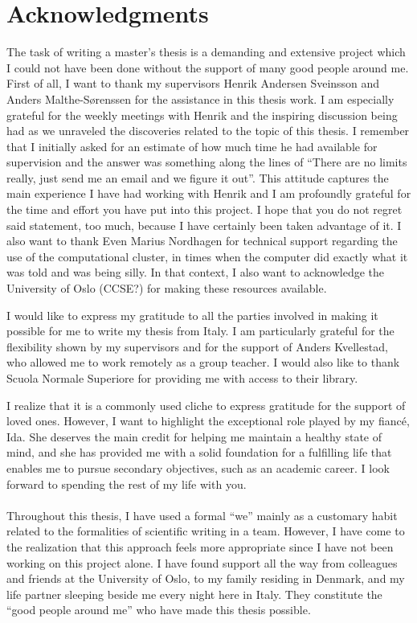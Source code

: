 \chapter*{Acknowledgments}
The task of writing a master's thesis is a demanding and extensive project which
I could not have been done without the support of many good people around me.
First of all, I want to thank my supervisors Henrik Andersen Sveinsson and
Anders Malthe-Sørenssen for the assistance in this thesis work. I am especially
grateful for the weekly meetings with Henrik and the inspiring discussion being
had as we unraveled the discoveries related to the topic of this thesis. I
remember that I initially asked for an estimate of how much time he had
available for supervision and the answer was something along the lines of
``There are no limits really, just send me an email and we figure it out''. This
attitude captures the main experience I have had working with Henrik and I am
profoundly grateful for the time and effort you have put into this project. I
hope that you do not regret said statement, too much, because I have certainly
been taken advantage of it. I also want to thank Even Marius Nordhagen for
technical support regarding the use of the computational cluster, in times when
the computer did exactly what it was told and was being silly. In that context,
I also want to acknowledge the University of Oslo (CCSE?) for making these
resources available. 

I would like to express my gratitude to all the parties involved in making it
possible for me to write my thesis from Italy. I am particularly grateful for
the flexibility shown by my supervisors and for the support of Anders
Kvellestad, who allowed me to work remotely as a group teacher. I would also
like to thank Scuola Normale Superiore for providing me with access to their
library.

I realize that it is a commonly used cliche to express gratitude for the support
of loved ones. However, I want to highlight the exceptional role played by my
fiancé, Ida. She deserves the main credit for helping me maintain a healthy
state of mind, and she has provided me with a solid foundation for a fulfilling
life that enables me to pursue secondary objectives, such as an academic career.
I look forward to spending the rest of my life with you. \\
\\
Throughout this thesis, I have used a formal ``we'' mainly as a customary habit
related to the formalities of scientific writing in a team. However, I have come
to the realization that this approach feels more appropriate since I have not
been working on this project alone. I have found support all the way from
colleagues and friends at the University of Oslo, to my family residing in
Denmark, and my life partner sleeping beside me every night here in Italy. They
constitute the ``good people around me'' who have made this thesis possible.


